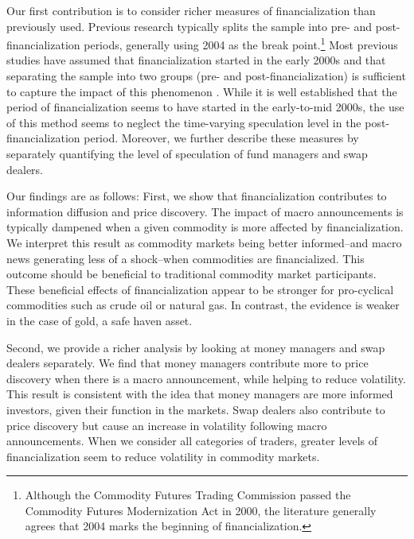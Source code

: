\documentclass[12pt]{article}
\begin{document}
Our first contribution is to consider richer measures of financialization than previously used. Previous research typically splits the sample into pre- and post-financialization periods, generally using 2004 as the break point.\footnote{Although the Commodity Futures Trading Commission passed the Commodity Futures Modernization Act in 2000, the literature generally agrees that 2004 marks the beginning of financialization.} Most previous studies have assumed that financialization started in the early 2000s and that separating the sample into two groups (pre- and post-financialization) is sufficient to capture the impact of this phenomenon \citep{buyukcsahin2010matters, kilian2014role,brunetti2016speculators,irwin2012financialization,stoll2010commodity,alquist2013role}. While it is well established that the period of financialization seems to have started in the early-to-mid 2000s, the use of this method seems to neglect the time-varying speculation level in the post-financialization period. Moreover, we further describe these measures by separately quantifying the level of speculation of fund managers and swap dealers.

 Our findings are as follows: First, we show that financialization contributes to information diffusion and price discovery. The impact of macro announcements is typically dampened when  a given commodity is more affected by financialization. We interpret this result as commodity markets being better informed--and macro news generating less of a shock--when commodities are financialized. This outcome should be beneficial to traditional commodity market participants.  These beneficial effects of financialization appear to be stronger for pro-cyclical commodities such as crude oil or natural gas. In contrast, the evidence is weaker in the case of gold, a safe haven asset. %

Second, we provide a richer analysis by looking at money managers and swap dealers separately. We find that money managers contribute more to price discovery when there is a macro announcement, while helping to reduce volatility. This result is consistent with the idea that money managers are more informed investors, given their function in the markets. Swap dealers also contribute to price discovery but  cause an increase in volatility following macro announcements. When we consider all categories of traders, greater levels of financialization seem to reduce  volatility in commodity markets. 
\end{document}
